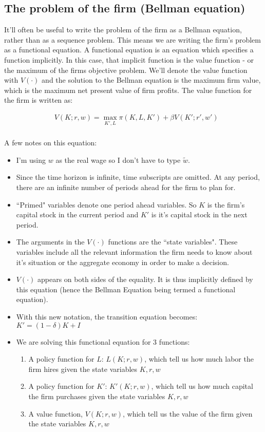\documentclass[letterpaper,12pt]{article}
\theoremstyle{definition}
\begin{document}
\begin{spacing}{1.5}
\subsection*{The problem of the firm (Bellman equation)}

It'll often be useful to write the problem of the firm as a Bellman equation, rather than as a sequence problem.  This means we are writing the firm's problem as a functional equation.  A functional equation is an equation which specifies a function implicitly.  In this case, that implicit function is the value function - or the maximum of the firms objective problem.  We'll denote the value function with $V(\cdot)$ and the solution to the Bellman equation is the maximum firm value, which is the maximum net present value of firm profits.  The value function for the firm is written as:

\begin{equation}
\label{eqn:firm_bellman}
\begin{split}
& V(K; r, w) = \max_{K', L} \pi(K,L,K') + \beta V(K'; r', w') \\
\end{split}
\end{equation}

A few notes on this equation:
\begin{itemize}
\item I'm using $w$ as the real wage so I don't have to type $\tilde{w}$.
\item Since the time horizon is infinite, time subscripts are omitted.  At any period, there are an infinite number of periods ahead for the firm to plan for.
\item ``Primed" variables denote one period ahead variables.  So $K$ is the firm's capital stock in the current period and $K'$ is it's capital stock in the next period.
\item The arguments in the $V(\cdot)$ functions are the ``state variables".  These variables include all the relevant information the firm needs to know about it's situation or the aggregate economy in order to make a decision.  
\item $V(\cdot)$ appears on both sides of the equality.  It is thus implicitly defined by this equation (hence the Bellman Equation being termed a functional equation).
\item With this new notation, the transition equation becomes: $K' = (1-\delta)K + I$
\item We are solving this functional equation for 3 functions:
	\begin{enumerate}
	\item A policy function for $L$: $L(K;r,w)$, which tell us how much labor the firm hires given the state variables $K,r,w$
	\item A policy function for $K'$: $K'(K;r,w)$, which tell us how much capital the firm purchases given the state variables $K,r,w$
	\item A value function, $V(K;r,w)$, which tell us the value of the firm given the state variables $K,r,w$
	\end{enumerate}
\end{itemize}


\end{spacing}
\end{document}
